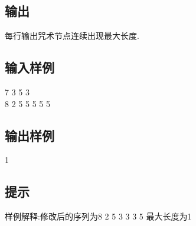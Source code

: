 \documentclass[12pt, a4paper]{article}
\begin{document}
\subsection*{输出}
每行输出咒术节点连续出现最大长度.

\subsection*{输入样例}

7 3 5 3\\
8 2 5 5 5 5 5 \\


\subsection*{输出样例}

1

 \subsection*{提示}
样例解释:修改后的序列为8 2 5 3 3 3 5
最大长度为1
\end{document}
